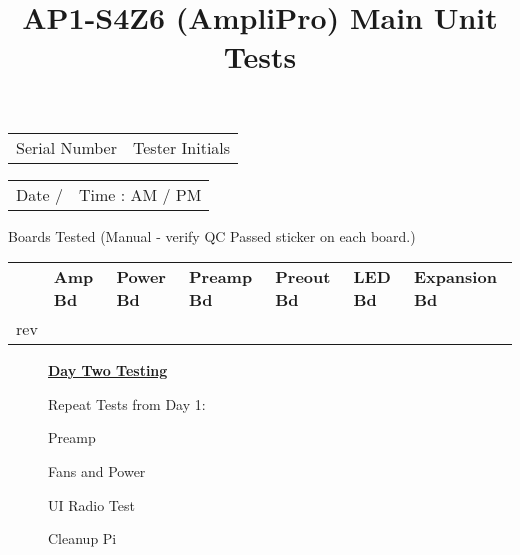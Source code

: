 \documentclass{article}
\title{AP1-S4Z6 (AmpliPro) Main Unit Tests}
\author{} %
\begin{document}
\maketitle\thispagestyle{empty}

\begin{tabularx}{\textwidth}{XX}
  Serial Number \hrulefill & Tester Initials \hrulefill
\end{tabularx}

\bigskip
\begin{tabularx}{\textwidth}{XX}
  Date \hrulefill\hspace{0.2em} / \hrulefill &
    Time \hrulefill\hspace{0.2em} : \hrulefill AM / PM
\end{tabularx}

\bigskip
\begin{checklist}
  \item Boards Tested (Manual - verify QC Passed sticker on each board.)
\end{checklist}

{\renewcommand{\arraystretch}{1.5} %
\begin{tabularx}{\textwidth}{lXXXXXX}
  & \textbf{Amp Bd} & \textbf{Power Bd} & \textbf{Preamp Bd} &
    \textbf{Preout Bd} & \textbf{LED Bd} & \textbf{Expansion Bd} \\
  \cline{2-7}
  rev & \multicolumn{1}{|c|}{} & \multicolumn{1}{|c|}{} & \multicolumn{1}{|c|}{}
    & \multicolumn{1}{|c|}{} & \multicolumn{1}{|c|}{} & \multicolumn{1}{|c|}{} \\
  \cline{2-7}
\end{tabularx}}

\begin{wrapfigure}{r}{0.33\textwidth}
  \begin{framed}
    \begin{center}\textbf{\underline{Day Two Testing}}\end{center}
    \vspace{2ex}
    \begin{checklist}
    \item Repeat Tests from Day 1:
    \begin{checklist}
      \item Preamp
      \item Fans and Power
    \end{checklist}
    \item UI Radio Test
    \item Cleanup Pi
    \end{checklist}
  \end{framed}
\end{wrapfigure}
\end{document}
